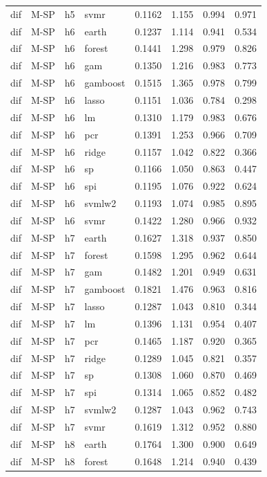 \begin{ThreePartTable}
\begin{longtable}[t]{llclcccc}
dif & M-SP & h5 & svmr & 0.1162 & 1.155 & 0.994 & 0.971\\
\addlinespace
dif & M-SP & h6 & earth & 0.1237 & 1.114 & 0.941 & 0.534\\
dif & M-SP & h6 & forest & 0.1441 & 1.298 & 0.979 & 0.826\\
dif & M-SP & h6 & gam & 0.1350 & 1.216 & 0.983 & 0.773\\
dif & M-SP & h6 & gamboost & 0.1515 & 1.365 & 0.978 & 0.799\\
dif & M-SP & h6 & lasso & 0.1151 & 1.036 & 0.784 & 0.298\\
dif & M-SP & h6 & lm & 0.1310 & 1.179 & 0.983 & 0.676\\
dif & M-SP & h6 & pcr & 0.1391 & 1.253 & 0.966 & 0.709\\
dif & M-SP & h6 & ridge & 0.1157 & 1.042 & 0.822 & 0.366\\
dif & M-SP & h6 & sp & 0.1166 & 1.050 & 0.863 & 0.447\\
dif & M-SP & h6 & spi & 0.1195 & 1.076 & 0.922 & 0.624\\
dif & M-SP & h6 & svmlw2 & 0.1193 & 1.074 & 0.985 & 0.895\\
dif & M-SP & h6 & svmr & 0.1422 & 1.280 & 0.966 & 0.932\\
\addlinespace
dif & M-SP & h7 & earth & 0.1627 & 1.318 & 0.937 & 0.850\\
dif & M-SP & h7 & forest & 0.1598 & 1.295 & 0.962 & 0.644\\
dif & M-SP & h7 & gam & 0.1482 & 1.201 & 0.949 & 0.631\\
dif & M-SP & h7 & gamboost & 0.1821 & 1.476 & 0.963 & 0.816\\
dif & M-SP & h7 & lasso & 0.1287 & 1.043 & 0.810 & 0.344\\
dif & M-SP & h7 & lm & 0.1396 & 1.131 & 0.954 & 0.407\\
dif & M-SP & h7 & pcr & 0.1465 & 1.187 & 0.920 & 0.365\\
dif & M-SP & h7 & ridge & 0.1289 & 1.045 & 0.821 & 0.357\\
dif & M-SP & h7 & sp & 0.1308 & 1.060 & 0.870 & 0.469\\
dif & M-SP & h7 & spi & 0.1314 & 1.065 & 0.852 & 0.482\\
dif & M-SP & h7 & svmlw2 & 0.1287 & 1.043 & 0.962 & 0.743\\
dif & M-SP & h7 & svmr & 0.1619 & 1.312 & 0.952 & 0.880\\
\addlinespace
dif & M-SP & h8 & earth & 0.1764 & 1.300 & 0.900 & 0.649\\
dif & M-SP & h8 & forest & 0.1648 & 1.214 & 0.940 & 0.439\\

\end{longtable}
\end{ThreePartTable}
